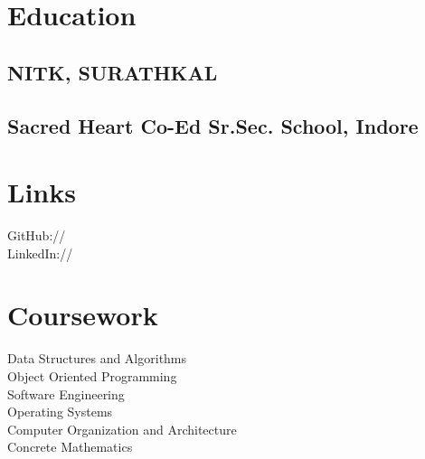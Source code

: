 \documentclass[]{deedy-resume-openfont}
\begin{document}
%
%


%
%

\begin{minipage}[t]{0.33\textwidth} 


\section{Education} 

\subsection{NITK, SURATHKAL}
\sectionsep

\subsection{Sacred Heart Co-Ed Sr.Sec. School, Indore}
\sectionsep
{}
\sectionsep



\section{Links} 
GitHub:// \href{https://github.com/manas11}{} \\
LinkedIn://  \href{https://www.linkedin.com/in/manasgupta11}{} \\
\sectionsep


\section{Coursework}
Data Structures and Algorithms \\
Object Oriented Programming \\
Software Engineering \\
Operating Systems \\
Computer Organization and Architecture \\
Concrete Mathematics \\
\sectionsep


\end{minipage}
\end{document}
